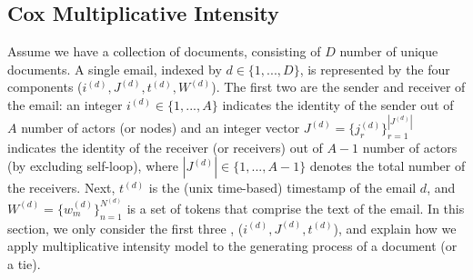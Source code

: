 \documentclass[a4paper]{article}
\begin{document}
\subsection{Cox Multiplicative Intensity} \label{subsec: Cox Multiplicative Intensity}
Assume we have a collection of documents, consisting of $D$ number of unique documents. A single email, indexed by $d \in \{1,...,D\}$, is represented by the four components ($i^{(d)}, J^{(d)}, t^{(d)},  W^{(d)}$). The first two are the sender and receiver of the email: an integer $i^{(d)} \in \{1,...,A\}$ indicates the identity of the sender out of $A$ number of actors (or nodes) and an integer vector $J^{(d)} = \{j_r^{(d)}\}_{r=1}^{|J^{(d)}|} $ indicates the identity of the receiver (or receivers) out of $A-1$ number of actors (by excluding self-loop), where $|J^{(d)}|\in \{1,...,A-1\}$ denotes the total number of the receivers. Next, $t^{(d)}$ is the (unix time-based) timestamp of the email $d$, and $W^{(d)} = \{w^{(d)}_m \}_{n=1}^{N^{(d)}}$ is a set of tokens that comprise the text of the email. In this section, we only consider the first three , ($i^{(d)}, J^{(d)}, t^{(d)}$), and explain how we apply multiplicative intensity model to the generating process of a document (or a tie). \\ \newline 
\end{document}
